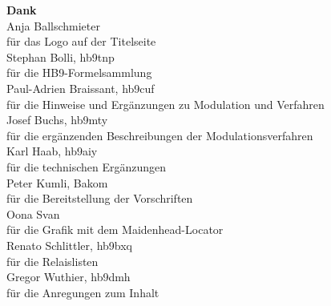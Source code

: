 {\begin{centering}
\newcommand{\dank}[2]{\vspace{4pt}#1\\{\footnotesize #2} \\}
\vspace{2em}
\textbf{Dank}\\
\dank{Anja Ballschmieter}{für das Logo auf der Titelseite}
\dank{Stephan Bolli, hb9tnp}{für die HB9-Formelsammlung}
\dank{Paul-Adrien Braissant, hb9cuf}{für die Hinweise und Ergänzungen zu Modulation und Verfahren}
\dank{Josef Buchs, hb9mty}{für die ergänzenden Beschreibungen der Modulationsverfahren}
\dank{Karl Haab, hb9aiy}{für die technischen Ergänzungen}
\dank{Peter Kumli, Bakom}{für die Bereitstellung der Vorschriften}
\dank{Oona Svan}{für die Grafik mit dem Maidenhead-Locator}
\dank{Renato Schlittler, hb9bxq}{für die Relaislisten}
\dank{Gregor Wuthier, hb9dmh}{für die Anregungen zum Inhalt}
\end{centering}

}